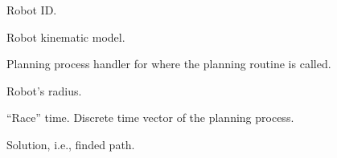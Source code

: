 \documentclass[letterpaper,10pt,english]{sphinxmanual}
\begin{document}
\begin{fulllineitems}
\begin{fulllineitems}
\label{Multi-robot motion planner:planning_sim.Robot.eyed}
Robot ID.

\end{fulllineitems}


\begin{fulllineitems}
\label{Multi-robot motion planner:planning_sim.Robot.k_mod}
Robot kinematic model.

\end{fulllineitems}


\begin{fulllineitems}
\label{Multi-robot motion planner:planning_sim.Robot.planning_process}
Planning process handler for where the planning routine is called.

\end{fulllineitems}


\begin{fulllineitems}
\label{Multi-robot motion planner:planning_sim.Robot.rho}
Robot's radius.

\end{fulllineitems}


\begin{fulllineitems}
\label{Multi-robot motion planner:planning_sim.Robot.rtime}
``Race'' time. Discrete time vector of the planning process.

\end{fulllineitems}


\begin{fulllineitems}
\label{Multi-robot motion planner:planning_sim.Robot.sol}
Solution, i.e., finded path.

\end{fulllineitems}


\end{fulllineitems}
\end{document}
